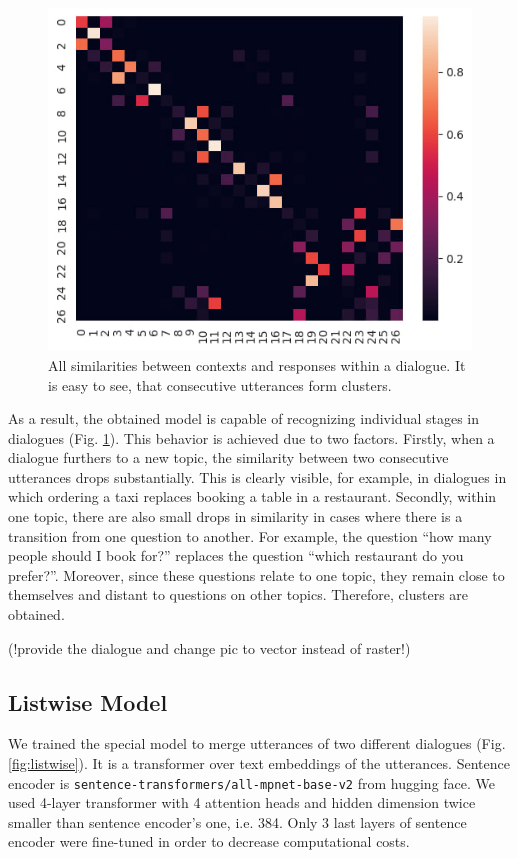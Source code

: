 \documentclass{article}
\begin{document}
\begin{figure}[!htb]
    \centering
    \includegraphics[width=0.5\linewidth]{figures/pairwise-cluster-heatmap.jpg}
    \caption{All similarities between contexts and responses within a dialogue. It is easy to see, that consecutive utterances form clusters.}
    \label{fig:pairwise-clister-heatmap}
\end{figure}

As a result, the obtained model is capable of recognizing individual stages in dialogues (Fig. \ref{fig:pairwise-clister-heatmap}). This behavior is achieved due to two factors. Firstly, when a dialogue furthers to a new topic, the similarity between two consecutive utterances drops substantially. This is clearly visible, for example, in dialogues in which ordering a taxi replaces booking a table in a restaurant. Secondly, within one topic, there are also small drops in similarity in cases where there is a transition from one question to another. For example, the question “how many people should I book for?” replaces the question “which restaurant do you prefer?”. Moreover, since these questions relate to one topic, they remain close to themselves and distant to questions on other topics. Therefore, clusters are obtained.

(!provide the dialogue and change pic to vector instead of raster!)

\subsection{Listwise Model}

We trained the special model to merge utterances of two different dialogues (Fig. \ref{fig:listwise}). It is a transformer over text embeddings of the utterances. Sentence encoder is \texttt{sentence-transformers/all-mpnet-base-v2} from hugging face. We used 4-layer transformer with 4 attention heads and hidden dimension twice smaller than sentence encoder's one, i.e. 384. Only 3 last layers of sentence encoder were fine-tuned in order to decrease computational costs.
\end{document}

